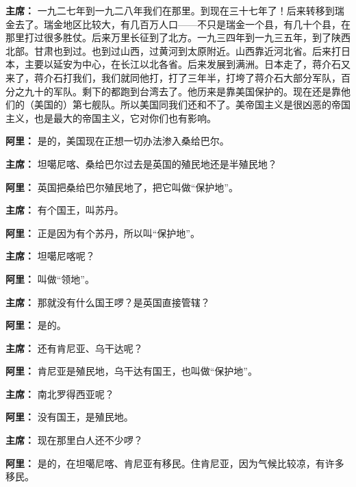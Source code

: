 \begin{list}{}
\item[\textbf{主席：}] 一九二七年到一九二八年我们在那里。到现在三十七年了！后来转移到瑞金去了。瑞金地区比较大，有几百万人口——不只是瑞金一个县，有几十个县，在那里打过很多胜仗。后来万里长征到了北方。一九三四年到一九三五年，到了陕西北部。甘肃也到过。也到过山西，过黄河到太原附近。山西靠近河北省。后来打日本，主要以延安为中心，在长江以北各省。后来发展到满洲。日本走了，蒋介石又来了，蒋介石打我们，我们就同他打，打了三年半，打垮了蒋介石大部分军队，百分之九十的军队。剩下的都跑到台湾去了。他历来是靠美国保护的。现在还是靠他们的（美国的）第七舰队。所以美国同我们还和不了。美帝国主义是很凶恶的帝国主义，也是最大的帝国主义，它对你们也有影响。

\item[\textbf{阿里：}] 是的，美国现在正想一切办法渗入桑给巴尔。

\item[\textbf{主席：}] 坦噶尼喀、桑给巴尔过去是英国的殖民地还是半殖民地？

\item[\textbf{阿里：}] 英国把桑给巴尔殖民地了，把它叫做“保护地”。

\item[\textbf{主席：}] 有个国王，叫苏丹。

\item[\textbf{阿里：}] 正是因为有个苏丹，所以叫“保护地”。

\item[\textbf{主席：}] 坦噶尼喀呢？

\item[\textbf{阿里：}] 叫做“领地”。

\item[\textbf{主席：}] 那就没有什么国王啰？是英国直接管辖？

\item[\textbf{阿里：}] 是的。

\item[\textbf{主席：}] 还有肯尼亚、乌干达呢？

\item[\textbf{阿里：}] 肯尼亚是殖民地，乌干达有国王，也叫做“保护地”。

\item[\textbf{主席：}] 南北罗得西亚呢？

\item[\textbf{阿里：}] 没有国王，是殖民地。

\item[\textbf{主席：}] 现在那里白人还不少啰？

\item[\textbf{阿里：}] 是的，在坦噶尼喀、肯尼亚有移民。住肯尼亚，因为气候比较凉，有许多移民。


\end{list}
